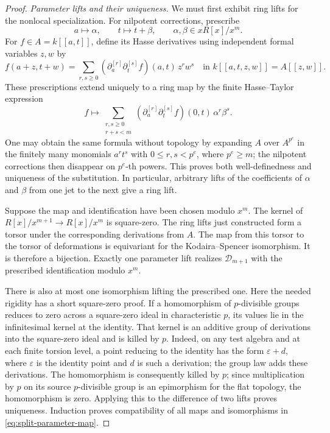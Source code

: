 \begin{proof}
\smallskip\noindent\emph{Parameter lifts and their uniqueness.}
We must first exhibit ring lifts for the nonlocal specialization.
For nilpotent corrections, prescribe
\[
  a\longmapsto\alpha,\qquad
  t\longmapsto t+\beta,\qquad
  \alpha,\beta\in xR[x]/x^m.
\]
For $f\in A=k[[a,t]]$, define its Hasse derivatives using independent
formal variables $z,w$ by
\[
 f(a+z,t+w)=\sum_{r,s\geq0}
   (\partial_a^{[r]}\partial_t^{[s]}f)(a,t)\,z^r w^s
 \quad\text{in }k[[a,t,z,w]]=A[[z,w]].
\]
These prescriptions extend uniquely to a ring map by the finite
Hasse--Taylor expression
\begin{equation}\label{eq:finite-taylor}
 f\longmapsto
   \sum_{\substack{r,s\geq0\\r+s<m}}
     (\partial_a^{[r]}\partial_t^{[s]}f)(0,t)\,
        \alpha^r\beta^s.
\end{equation}
One may obtain the same formula without topology by expanding $A$
over $A^{p^e}$ in the finitely many monomials $a^r t^s$ with
$0\leq r,s<p^e$, where $p^e\geq m$; the nilpotent corrections then
disappear on $p^e$-th powers.  This proves both well-definedness and
uniqueness of the substitution. In particular, arbitrary lifts of the
coefficients of $\alpha$ and $\beta$ from one jet to the next give a
ring lift.

Suppose the map and identification have been chosen modulo $x^m$.
The kernel of $R[x]/x^{m+1}\to R[x]/x^m$ is square-zero.
The ring lifts just constructed form a
torsor under the corresponding derivations from $A$.  The map from
this torsor to the torsor of deformations is equivariant for the
Kodaira--Spencer isomorphism.  It is therefore a bijection.
Exactly one parameter lift realizes $\mathcal D_{m+1}$ with the
prescribed identification modulo $x^m$.

There is also at most one isomorphism lifting the prescribed one.
Here the needed rigidity has a short square-zero proof.  If a
homomorphism of $p$-divisible groups reduces to zero across a
square-zero ideal in characteristic $p$, its values lie in the
infinitesimal kernel at the identity.  That kernel is an additive
group of derivations into the square-zero ideal and is killed by
$p$.  Indeed, on any test algebra and at each finite torsion level,
a point reducing to the identity has the form $\varepsilon+d$,
where $\varepsilon$ is the identity point and $d$ is such a
derivation; the group law adds these derivations.  The
homomorphism is consequently killed by $p$; since multiplication by
$p$ on its source $p$-divisible group is an epimorphism for the flat
topology, the homomorphism is zero.  Applying this to the difference
of two lifts proves uniqueness.  Induction proves compatibility of
all maps and isomorphisms in \eqref{eq:split-parameter-map}.


\end{proof}
